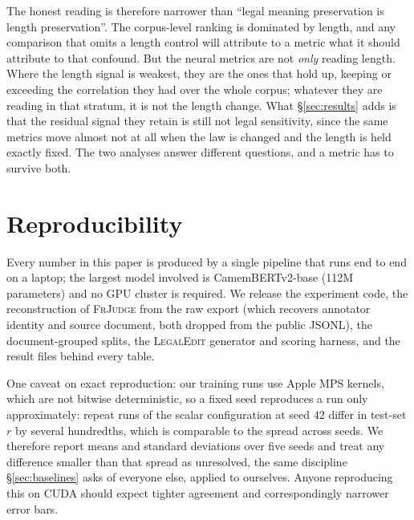 \documentclass[11pt]{article}
\begin{document}
The honest reading is therefore narrower than ``legal meaning preservation is
length preservation''. The corpus-level ranking is dominated by length, and any
comparison that omits a length control will attribute to a metric what it should
attribute to that confound. But the neural metrics are not \emph{only} reading
length. Where the length signal is weakest, they are the ones that hold up,
keeping or exceeding the correlation they had over the whole corpus; whatever
they are reading in that stratum, it is not the length change. What
\S\ref{sec:results} adds is that the residual signal they retain is still not
legal sensitivity, since the same metrics move almost not at all when the law is
changed and the length is held exactly fixed. The two analyses answer different
questions, and a metric has to survive both.

\section{Reproducibility}
\label{app:repro}

Every number in this paper is produced by a single pipeline that runs end to end
on a laptop; the largest model involved is CamemBERTv2-base (112M parameters)
and no GPU cluster is required. We release the experiment code, the
reconstruction of \textsc{FrJudge} from the raw export (which recovers annotator
identity and source document, both dropped from the public JSONL), the
document-grouped splits, the \textsc{LegalEdit} generator and scoring harness,
and the result files behind every table.

One caveat on exact reproduction: our training runs use Apple MPS kernels, which
are not bitwise deterministic, so a fixed seed reproduces a run only
approximately: repeat runs of the scalar configuration at seed $42$ differ in
test-set $r$ by several hundredths, which is comparable to the spread across
seeds. We therefore report means and standard deviations over five seeds and
treat any difference smaller than that spread as unresolved, the same discipline
\S\ref{sec:baselines} asks of everyone else, applied to ourselves. Anyone
reproducing this on CUDA should expect tighter agreement and correspondingly
narrower error bars.
\end{document}
